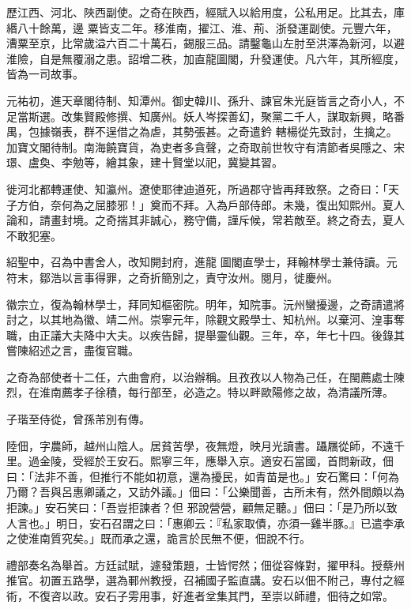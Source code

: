 \begin{pinyinscope}
 歷江西、河北、陜西副使。之奇在陜西，經賦入以給用度，公私用足。比其去，庫緡八十餘萬，邊
 粟皆支二年。移淮南，擢江、淮、荊、浙發運副使。元豐六年，漕粟至京，比常歲溢六百二十萬石，錫服三品。請鑿龜山左肘至洪澤為新河，以避淮險，自是無覆溺之患。詔增二秩，加直龍圖閣，升發運使。凡六年，其所經度，皆為一司故事。



 元祐初，進天章閣待制、知潭州。御史韓川、孫升、諫官朱光庭皆言之奇小人，不足當斯選。改集賢殿修撰、知廣州。妖人岑探善幻，聚黨二千人，謀取新興，略番禺，包據嶺表，群不逞借之為虐，其勢張甚。之奇遣鈐
 轄楊從先致討，生擒之。加寶文閣待制。南海饒寶貨，為吏者多貪聲，之奇取前世牧守有清節者吳隱之、宋璟、盧奐、李勉等，繪其象，建十賢堂以祀，冀變其習。



 徙河北都轉運使、知瀛州。遼使耶律迪道死，所過郡守皆再拜致祭。之奇曰：「天子方伯，奈何為之屈膝邪！」奠而不拜。入為戶部侍郎。未幾，復出知熙州。夏人論和，請畫封境。之奇揣其非誠心，務守備，謹斥候，常若敵至。終之奇去，夏人不敢犯塞。



 紹聖中，召為中書舍人，改知開封府，進龍
 圖閣直學士，拜翰林學士兼侍讀。元符末，鄒浩以言事得罪，之奇折簡別之，責守汝州。閱月，徙慶州。



 徽宗立，復為翰林學士，拜同知樞密院。明年，知院事。沅州蠻擾邊，之奇請遣將討之，以其地為徽、靖二州。崇寧元年，除觀文殿學士、知杭州。以棄河、湟事奪職，由正議大夫降中大夫。以疾告歸，提舉靈仙觀。三年，卒，年七十四。後錄其嘗陳紹述之言，盡復官職。



 之奇為部使者十二任，六曲會府，以治辦稱。且孜孜以人物為己任，在閩薦處士陳
 烈，在淮南薦孝子徐積，每行部至，必造之。特以畔歐陽修之故，為清議所薄。



 子瑎至侍從，曾孫芾別有傳。



 陸佃，字農師，越州山陰人。居貧苦學，夜無燈，映月光讀書。躡屩從師，不遠千里。過金陵，受經於王安石。熙寧三年，應舉入京。適安石當國，首問新政，佃曰：「法非不善，但推行不能如初意，還為擾民，如青苗是也。」安石驚曰：「何為乃爾？吾與呂惠卿議之，又訪外議。」佃曰：「公樂聞善，古所未有，然外間頗以為拒諫。」安石笑曰：「吾豈拒諫者？但
 邪說營營，顧無足聽。」佃曰：「是乃所以致人言也。」明日，安石召謂之曰：「惠卿云：『私家取債，亦須一雞半豚。』已遣李承之使淮南質究矣。」既而承之還，詭言於民無不便，佃說不行。



 禮部奏名為舉首。方廷試賦，遽發策題，士皆愕然；佃從容條對，擢甲科。授蔡州推官。初置五路學，選為鄆州教授，召補國子監直講。安石以佃不附己，專付之經術，不復咨以政。安石子雱用事，好進者坌集其門，至崇以師禮，佃待之如常。




\end{pinyinscope}
